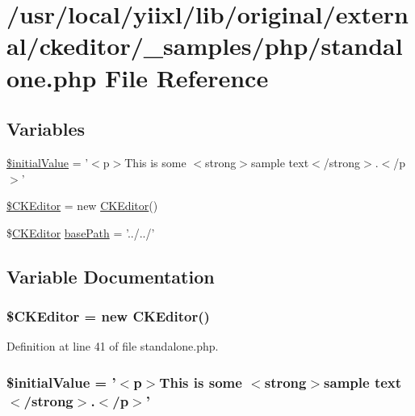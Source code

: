 \hypertarget{standalone_8php}{
\section{/usr/local/yiixl/lib/original/external/ckeditor/\_\-samples/php/standalone.php File Reference}
\label{standalone_8php}
}
\subsection*{Variables}
\begin{DoxyCompactItemize}
\item 
\hyperlink{standalone_8php_ab352e6e5b00f0a2533b1b64b8306e95f}{\$initialValue} = '$<$p$>$This is some $<$strong$>$sample text$<$/strong$>$.$<$/p$>$'
\item 
\hyperlink{standalone_8php_aec6d261a24c9dcb30ee1cfa7762a4a44}{\$CKEditor} = new \hyperlink{classCKEditor}{CKEditor}()
\item 
\$\hyperlink{classCKEditor}{CKEditor} \hyperlink{standalone_8php_a94a267f018012b013582daafb6a89618}{basePath} = '../../'
\end{DoxyCompactItemize}


\subsection{Variable Documentation}
\hypertarget{standalone_8php_aec6d261a24c9dcb30ee1cfa7762a4a44}{
\subsubsection[{\$CKEditor}]{\setlength{\rightskip}{0pt plus 5cm}\${\bf CKEditor} = new {\bf CKEditor}()}}
\label{standalone_8php_aec6d261a24c9dcb30ee1cfa7762a4a44}


Definition at line 41 of file standalone.php.

\hypertarget{standalone_8php_ab352e6e5b00f0a2533b1b64b8306e95f}{
\subsubsection[{\$initialValue}]{\setlength{\rightskip}{0pt plus 5cm}\$initialValue = '$<$p$>$This is some $<$strong$>$sample text$<$/strong$>$.$<$/p$>$'}}
\label{standalone_8php_ab352e6e5b00f0a2533b1b64b8306e95f}


